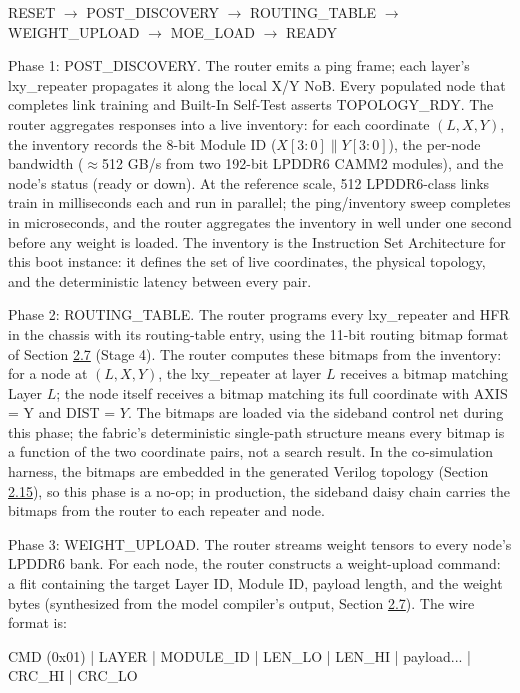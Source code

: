 \documentclass[10pt,twocolumn]{article}
\begin{document}
RESET $\rightarrow$ POST\_DISCOVERY $\rightarrow$ ROUTING\_TABLE $\rightarrow$ WEIGHT\_UPLOAD $\rightarrow$ MOE\_LOAD $\rightarrow$ READY

Phase 1: POST\_DISCOVERY. The router emits a ping frame; each layer's lxy\_repeater propagates it along the local X/Y NoB. Every populated node that completes link training and Built-In Self-Test asserts TOPOLOGY\_RDY. The router aggregates responses into a live inventory: for each coordinate $(L, X, Y)$, the inventory records the 8-bit Module ID ($X[3:0] \parallel Y[3:0]$), the per-node bandwidth ($\approx$512 GB/s from two 192-bit LPDDR6 CAMM2 modules), and the node's status (ready or down). At the reference scale, 512 LPDDR6-class links train in milliseconds each and run in parallel; the ping/inventory sweep completes in microseconds, and the router aggregates the inventory in well under one second before any weight is loaded. The inventory is the Instruction Set Architecture for this boot instance: it defines the set of live coordinates, the physical topology, and the deterministic latency between every pair.

Phase 2: ROUTING\_TABLE. The router programs every lxy\_repeater and HFR in the chassis with its routing-table entry, using the 11-bit routing bitmap format of Section \hyperref[sec:2.7]{2.7} (Stage 4). The router computes these bitmaps from the inventory: for a node at $(L, X, Y)$, the lxy\_repeater at layer $L$ receives a bitmap matching Layer $L$; the node itself receives a bitmap matching its full coordinate with AXIS = Y and DIST = $Y$. The bitmaps are loaded via the sideband control net during this phase; the fabric's deterministic single-path structure means every bitmap is a function of the two coordinate pairs, not a search result. In the co-simulation harness, the bitmaps are embedded in the generated Verilog topology (Section \hyperref[sec:2.15]{2.15}), so this phase is a no-op; in production, the sideband daisy chain carries the bitmaps from the router to each repeater and node.

Phase 3: WEIGHT\_UPLOAD. The router streams weight tensors to every node's LPDDR6 bank. For each node, the router constructs a weight-upload command: a flit containing the target Layer ID, Module ID, payload length, and the weight bytes (synthesized from the model compiler's output, Section \hyperref[sec:2.7]{2.7}). The wire format is:

CMD (0x01) | LAYER | MODULE\_ID | LEN\_LO | LEN\_HI | payload... | CRC\_HI | CRC\_LO
\end{document}
